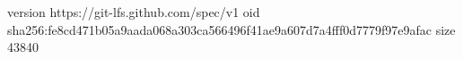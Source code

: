 version https://git-lfs.github.com/spec/v1
oid sha256:fe8cd471b05a9aada068a303ca566496f41ae9a607d7a4fff0d7779f97e9afac
size 43840
